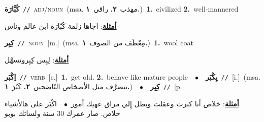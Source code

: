 \documentclass[10pt,a4paper,twoside]{article} %
\begin{document}
\begin{multicols}{2}
{{{{{{{{{{{{{\setlength\topsep{0pt}\textbf{\foreignlanguage{arabic}{كُبَّارَة}}\ {\color{gray}\texttt{//}\color{black}}\ \textsc{adj/noun}\ \color{gray}(msa. \foreignlanguage{arabic}{مهذب}~\foreignlanguage{arabic}{\textbf{٢.}}  \foreignlanguage{arabic}{راقي}~\foreignlanguage{arabic}{\textbf{١.}})\color{black}\ \textbf{1.}~civilized  \textbf{2.}~well-mannered\  \begin{flushright}\color{gray}\foreignlanguage{arabic}{\textbf{\underline{\foreignlanguage{arabic}{أمثلة}}}: اجاها زلمة كُبّارَة ابن عالم وناس}\end{flushright}\color{black}} \vspace{2mm}

{\setlength\topsep{0pt}\textbf{\foreignlanguage{arabic}{كِبِر}}\ {\color{gray}\texttt{//}\color{black}}\ \textsc{noun}\ [m.]\ \color{gray}(msa. \foreignlanguage{arabic}{مِعْطَف من الصوف}~\foreignlanguage{arabic}{\textbf{١.}})\color{black}\ \textbf{1.}~wool coat\  \begin{flushright}\color{gray}\foreignlanguage{arabic}{\textbf{\underline{\foreignlanguage{arabic}{أمثلة}}}: لِبِس كِبِروتسهَّل}\end{flushright}\color{black}} \vspace{2mm}

{\setlength\topsep{0pt}\textbf{\foreignlanguage{arabic}{اِكْبَر}}\ {\color{gray}\texttt{//}\color{black}}\ \textsc{verb}\ [c.]\ \textbf{1.}~get old.  \textbf{2.}~behave like mature people\ \ $\bullet$\ \ \setlength\topsep{0pt}\textbf{\foreignlanguage{arabic}{يِكْبَر}}\ {\color{gray}\texttt{//}\color{black}}\ [i.]\ \color{gray}(msa. \foreignlanguage{arabic}{يتصرَّف مثل الأضخاص النّاضجين}~\foreignlanguage{arabic}{\textbf{٢.}}  \foreignlanguage{arabic}{كَبُرَ}~\foreignlanguage{arabic}{\textbf{١.}})\color{black}\ \ $\bullet$\ \ \setlength\topsep{0pt}\textbf{\foreignlanguage{arabic}{كِبِر}}\ {\color{gray}\texttt{//}\color{black}}\ [p.]\  \begin{flushright}\color{gray}\foreignlanguage{arabic}{\textbf{\underline{\foreignlanguage{arabic}{أمثلة}}}: خلاص أنا كبرت وعقلت وبطل إِلي مراق عهيك أمور\ $\bullet$\ \  اكْبَر على هالأشياء خلاص. صار عمرك 30 سنة ولساتك بوبو}\end{flushright}\color{black}} \vspace{2mm}

}}}}}}}}}}}}
\end{multicols}
\end{document}

